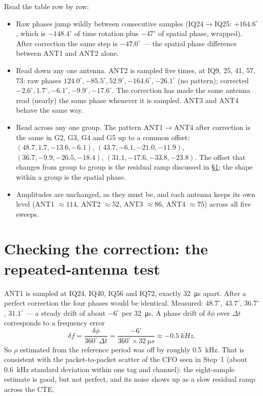 \documentclass[11pt,a4paper]{article}
\begin{document}
Read the table row by row:
\begin{itemize}
  \item Raw phases jump wildly between consecutive samples (IQ24$\to$IQ25: $+164.6^\circ$, which is $-148.4^\circ$ of time rotation plus $-47^\circ$ of spatial phase, wrapped). After correction the same step is $-47.0^\circ$ --- the spatial phase difference between ANT1 and ANT2 alone.
  \item Read down any one antenna. ANT2 is sampled five times, at IQ9, 25, 41, 57, 73: raw phases $124.0^\circ, -85.5^\circ, 52.9^\circ, -164.6^\circ, -26.1^\circ$ (no pattern); corrected $-2.6^\circ, 1.7^\circ, -6.1^\circ, -9.9^\circ, -17.6^\circ$. The correction has made the same antenna read (nearly) the same phase whenever it is sampled. ANT3 and ANT4 behave the same way.
  \item Read across any one group. The pattern ANT1$\to$ANT4 after correction is the same in G2, G3, G4 and G5 up to a common offset: $(48.7, 1.7, -13.6, -6.1)$, $(43.7, -6.1, -21.0, -11.9)$, $(36.7, -9.9, -26.5, -18.4)$, $(31.1, -17.6, -33.8, -23.8)$. The offset that changes from group to group is the residual ramp discussed in \S\ref{sec:check}; the shape within a group is the spatial phase.
  \item Amplitudes are unchanged, as they must be, and each antenna keeps its own level (ANT1 $\approx 114$, ANT2 $\approx 52$, ANT3 $\approx 86$, ANT4 $\approx 75$) across all five sweeps.
\end{itemize}

\section{Checking the correction: the repeated-antenna test}\label{sec:check}
ANT1 is sampled at IQ24, IQ40, IQ56 and IQ72, exactly \SI{32}{\micro s} apart. After a perfect correction the four phases would be identical. Measured: $48.7^\circ$, $43.7^\circ$, $36.7^\circ$, $31.1^\circ$ --- a steady drift of about $-6^\circ$ per \SI{32}{\micro s}. A phase drift of $\delta\phi$ over $\Delta t$ corresponds to a frequency error
\[
  \delta f = \frac{\delta\phi}{360^\circ\,\Delta t} = \frac{-6^\circ}{360^\circ\times\SI{32}{\micro s}} \approx -\SI{0.5}{kHz} .
\]
So $\rho$ estimated from the reference period was off by roughly \SI{0.5}{kHz}. That is consistent with the packet-to-packet scatter of the CFO seen in Step~1 (about \SI{0.6}{kHz} standard deviation within one tag and channel): the eight-sample estimate is good, but not perfect, and its noise shows up as a slow residual ramp across the CTE.
\end{document}
